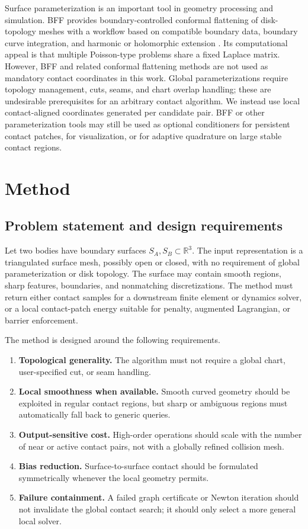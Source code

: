 \documentclass[preprint,12pt]{elsarticle}
\newcommand{\R}{\mathbb{R}}
\begin{document}
Surface parameterization is an important tool in geometry processing and simulation. BFF provides boundary-controlled conformal flattening of disk-topology meshes with a workflow based on compatible boundary data, boundary curve integration, and harmonic or holomorphic extension \cite{sawhney2018bff}. Its computational appeal is that multiple Poisson-type problems share a fixed Laplace matrix. However, BFF and related conformal flattening methods are not used as mandatory contact coordinates in this work. Global parameterizations require topology management, cuts, seams, and chart overlap handling; these are undesirable prerequisites for an arbitrary contact algorithm. We instead use local contact-aligned coordinates generated per candidate pair. BFF or other parameterization tools may still be used as optional conditioners for persistent contact patches, for visualization, or for adaptive quadrature on large stable contact regions.

\section{Method}
\label{sec:method}

\subsection{Problem statement and design requirements}

Let two bodies have boundary surfaces $S_A,S_B\subset\R^3$. The input representation is a triangulated surface mesh, possibly open or closed, with no requirement of global parameterization or disk topology. The surface may contain smooth regions, sharp features, boundaries, and nonmatching discretizations. The method must return either contact samples for a downstream finite element or dynamics solver, or a local contact-patch energy suitable for penalty, augmented Lagrangian, or barrier enforcement.

The method is designed around the following requirements.
\begin{enumerate}[leftmargin=*]
    \item \textbf{Topological generality.} The algorithm must not require a global chart, user-specified cut, or seam handling.
    \item \textbf{Local smoothness when available.} Smooth curved geometry should be exploited in regular contact regions, but sharp or ambiguous regions must automatically fall back to generic queries.
    \item \textbf{Output-sensitive cost.} High-order operations should scale with the number of near or active contact pairs, not with a globally refined collision mesh.
    \item \textbf{Bias reduction.} Surface-to-surface contact should be formulated symmetrically whenever the local geometry permits.
    \item \textbf{Failure containment.} A failed graph certificate or Newton iteration should not invalidate the global contact search; it should only select a more general local solver.
\end{enumerate}
\end{document}

